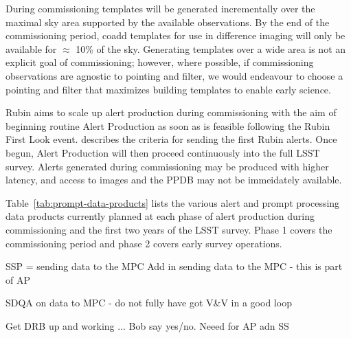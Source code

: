 During commissioning templates will be generated incrementally over the maximal sky area supported by the available observations.
By the end of the commissioning period, coadd templates for use in difference imaging will only be available for $\approx$ 10\% of the sky.
Generating templates over a wide area is not an explicit goal of commissioning;  however, where possible, if commissioning observations are agnostic to pointing and filter, we would endeavour to choose a pointing and filter that maximizes building templates to enable early science.

Rubin aims to scale up alert production during commissioning with the aim of beginning routine Alert Production as soon as is feasible following the Rubin First Look event.
 describes the criteria for sending the first Rubin alerts.
Once begun, Alert Production will then proceed continuously into the full LSST survey.
Alerts generated during commissioning may be produced with higher latency, and access to images and the PPDB may not be immeidately available.

Table~\ref{tab:prompt-data-products} lists the various alert and prompt processing data products currently planned at each phase of alert production during commissioning and the first two years of the LSST survey. 
Phase 1 covers the commissioning period and phase 2 covers early survey operations.  




SSP = sending data to the MPC 
Add in sending data to the MPC - this is part of AP 

SDQA on data to MPC - do not fully have got V\&V in a good loop 

Get DRB up and working ... Bob say yes/no. Neeed for AP adn SS 
